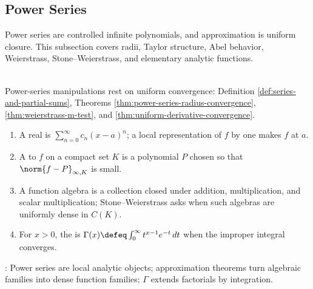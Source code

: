 \subsection{Power Series}

%


Power series are controlled infinite polynomials, and approximation is uniform closure. This subsection covers radii, Taylor structure, Abel behavior, Weierstrass, Stone--Weierstrass, and elementary analytic functions.

\begin{motivation} \label{mot:power-series-as-controlled-infinite-polynomials} \\
Power-series manipulations rest on uniform convergence: Definition \ref{def:series-and-partial-sums}, Theorems \ref{thm:power-series-radius-convergence}, \ref{thm:weierstrass-m-test}, and \ref{thm:uniform-derivative-convergence}.
\end{motivation}

\begin{definition} \label{def:power-approx-fourier-core-source-todo}\label{def:power-approx-core-objects} 
\begin{enumerate}[label=(\roman*)]
\setlength{\itemsep}{0pt}
\item A real  is $\sum\limits_{n=0}^{\infty}c_n(x-a)^n$; a local representation of $f$ by one makes $f$  at $a$.
\item A  to $f$ on a compact set $K$ is a polynomial $P$ chosen so that $\norm{f-P}_{\infty,K}$ is small.
\item A function algebra is a collection closed under addition, multiplication, and scalar multiplication; Stone--Weierstrass asks when such algebras are uniformly dense in $C(K)$.
\item For $x>0$, the  is $\Gamma(x)\defeq\int_0^\infty t^{x-1}e^{-t}\,dt$ when the improper integral converges.
\end{enumerate}
: Power series are local analytic objects; approximation theorems turn algebraic families into dense function families; $\Gamma$ extends factorials by integration.
\end{definition}

